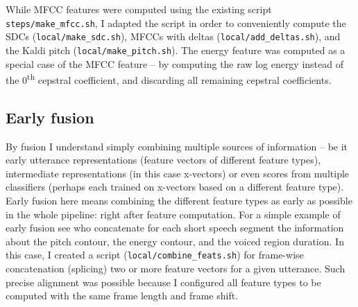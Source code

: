 \documentclass[bsc,frontabs,twoside,singlespacing,parskip,deptreport]{infthesis}
\begin{document}
{{{      While MFCC features were computed using the existing script \verb|steps/make_mfcc.sh|, I adapted the script in order to conveniently compute the SDCs (\verb|local/make_sdc.sh|), MFCCs with deltas (\verb|local/add_deltas.sh|), and the Kaldi pitch (\verb|local/make_pitch.sh|). The energy feature was computed as a special case of the MFCC feature -- by computing the raw log energy instead of the 0\textsuperscript{th} cepstral coefficient, and discarding all remaining cepstral coefficients.
    }

    \subsection{Early fusion}{
      \label{sec:early-fusion}
      By fusion I understand simply combining multiple sources of information -- be it early utterance representations (feature vectors of different feature types), intermediate representations (in this case x-vectors) or even scores from multiple classifiers (perhaps each trained on x-vectors based on a different feature type).
      Early fusion here means combining the different feature types as early as possible in the whole pipeline: right after feature computation. For a simple example of early fusion see \citet{Martinez_et_al_2012} who concatenate for each short speech segment the information about the pitch contour, the energy contour, and the voiced region duration. In this case, I created a script (\verb|local/combine_feats.sh|) for frame-wise concatenation (splicing) two or more feature vectors for a given utterance. Such precise alignment was possible because I configured all feature types to be computed with the same frame length and frame shift.
    }

}}
\end{document}
